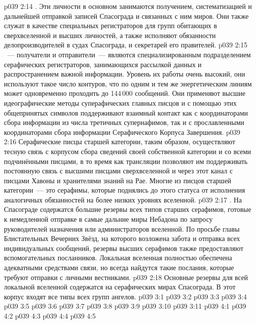 \vs p039 2:14 . Эти личности в основном занимаются получением, систематизацией и дальнейшей отправкой записей Спасограда и связанных с ним миров. Они также служат в качестве специальных регистраторов для групп обитающих в сверхвселенной и высших личностей, а также исполняют обязанности делопроизводителей в судах Спасограда, и секретарей его правителей.
\vs p039 2:15 \pc {}~--- получатели и отправители~--- являются специализированным подразделением серафических регистраторов, занимающихся рассылкой данных и распространением важной информации. Уровень их работы очень высокий, они используют такое число контуров, что по одним и тем же энергетическим линиям может одновременно проходить до 144\,000 сообщений. Они применяют высшие идеографические методы суперафических главных писцов и с помощью этих общепринятых символов поддерживают взаимный контакт как с координаторами сбора информации из числа третичных супернафимов, так и с прославленными координаторами сбора информации Серафического Корпуса Завершения.
\vs p039 2:16 Серафические писцы старшей категории, таким образом, осуществляют тесную связь с корпусом сбора сведений своей собственной категории и со всеми подчинёнными писцами, в то время как трансляции позволяют им поддерживать постоянную связь с высшими писцами сверхвселенной и через этот канал с писцами Хавоны и хранителями знаний на Рае. Многие из писцов старшей категории~--- это серафимы, которые поднялись до этого статуса от исполнения аналогичных обязанностей на более низких уровнях вселенной.
\vs p039 2:17 . На Спасограде содержатся большие резервы всех типов старших серафимов, готовые к немедленной отправке в самые дальние миры Небадона по запросу руководителей назначения или администраторов вселенной. По просьбе главы Блистательных Вечерних Звёзд, на которого возложена забота и отправка всех индивидуальных сообщений, резервы высших серафимов также предоставляют вспомогательных посланников. Локальная вселенная полностью обеспечена адекватными средствами связи, но всегда найдутся такие послания, которые требуют отправки с личными вестниками.
\vs p039 2:18 \pc Основные резервы для всей локальной вселенной содержатся на серафических мирах Спасограда. В этот корпус входят все типы всех групп ангелов.
\vs p039 3:1 
\vs p039 3:2 
\vs p039 3:3 
\vs p039 3:4 
\vs p039 3:5 
\vs p039 3:6 
\vs p039 3:7 
\vs p039 3:8 
\vs p039 3:9 
\vs p039 3:10 
\vs p039 3:11 
\vs p039 4:1 
\vs p039 4:2 
\vs p039 4:3 
\vs p039 4:4 
\vs p039 4:5 
